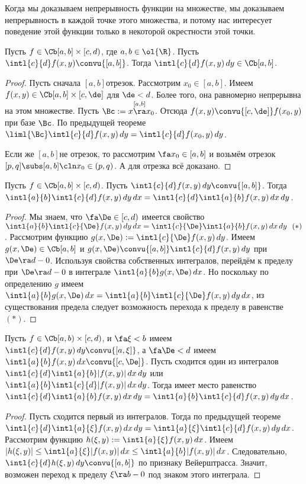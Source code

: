 \documentclass[a4paper]{article}
\newcommand{\intlab}{\intl{a}{b}}
\begin{document}
\begin{note}
Когда мы доказываем непрерывность функции на множестве, мы доказываем непрерывность в
каждой точке этого множества, и потому нас
интересует поведение этой функции только в некоторой окрестности этой точки.
\end{note}

\begin{imp}
Пусть $f \in\Cb[a,b]\times[c,d)$, где $a,b \in \ol{\R}$. Пусть $\intl{c}{d}f(x,y)\convu{[a,b]}$.
Тогда $\intl{c}{d}f(x,y)\,d y \in\Cb[a,b]$.
\end{imp}
\begin{proof}
Пусть сначала $[a,b]$\т отрезок. Рассмотрим $x_0 \in [a,b]$. Имеем
$f(x,y)\in\Cb[a,b]\times[c,\de]$ для $\de < d$. Более того, она равномерно непрерывна на этом
множестве. Пусть $\Bc := x \overset{[a,b]}{\ra} x_0$. Отсюда $f(x,y)\convu{[c,\de]}f(x_0,y)$ при
базе $\Bc$. По предыдущей теореме $\liml{\Bc}\intl{c}{d}f(x,y)\,d y=\intl{c}{d}f(x_0,y)\,d y$.

Если же $[a,b]$\т не отрезок, то рассмотрим $\fa x_0 \in [a,b]$ и возьмём отрезок
$[p,q] \subs [a,b]\cln x_0 \in (p,q)$. А для отрезка всё доказано.
\end{proof}

\begin{theorem}
Пусть $f\in\Cb[a,b]\times[c,d)$. Пусть $\intl{c}{d}f(x,y)\,d y\convu{[a,b]}$. Тогда $\intlab
\intl{c}{d}f(x,y)\,d y\,d x = \intl{c}{d}\intlab f(x,y)\,d x\,d y$.
\end{theorem}
\begin{proof}
Мы знаем, что $\fa \De \in [c,d)$ имеется свойство $\intlab \intl{c}{\De}f(x,y)\,d y\,d x =
\intl{c}{\De}\intlab f(x,y)\,d x\,d y~~(*)$. Рассмотрим функцию $g(x,\De) :=
\intl{c}{\De}f(x,y)\,d y$. Имеем $g(x,\De) \in\Cb[a,b]$ и
$g(x,\De)\convu{[a,b]}\intl{c}{d}f(x,y)\,d y$ при $\De \ra d-0$. Используя свойства собственных
интегралов, перейдём к пределу при $\De \ra d-0$ в интеграле $\intlab g(x,\De)\,d x$. Но поскольку
по определению $g$ имеем $\intlab g(x,\De)\,d x=\intlab \intl{c}{\De}f(x,y)\,d y\,d x$, из
существования предела следует возможность перехода к пределу в равенстве $(*)$.
\end{proof}

\begin{theorem}
Пусть $f\in\Cb[a,b)\times[c,d)$, и $\fa \xi < b$ имеем $\intl{c}{d}f(x,y)\,d y
\convu{[a,\xi]}$, а $\fa \De < d$ имеем $\intlab f(x,y)\,d x \convu{[c,\De]}$. Пусть сходится
один из интегралов $\intl{c}{d}\intlab |f(x,y)|\,d x\,d y$ или $\intlab \intl{c}{d}|f(x,y)|\,d
x\,d y$. Тогда имеет место равенство $\intl{c}{d}\intlab f(x,y)\,d x\,d y=\intlab \intl{c}{d}f(x,y)\,d y\,d x$.
\end{theorem}
\begin{proof}
Пусть сходится первый из интегралов. Тогда по предыдущей теореме
$\intl{c}{d}\intl{a}{\xi}f(x,y)\,d x\,d y=\intl{a}{\xi}\intl{c}{d}f(x,y)\,d y\,d x$. Рассмотрим
функцию $h(\xi,y) := \intl{a}{\xi}f(x,y)\,d x$. Имеем $|h(\xi,y)| \le \intl{a}{\xi}|f(x,y)|\,d x
\le \intlab |f(x,y)|\,d x$. Следовательно, $\intl{c}{d}h(\xi,y)\,d y \convu{[a,b]}$ по признаку
Вейерштрасса. Значит, возможен переход к пределу $\xi \ra b-0$ под знаком этого интеграла.
\end{proof}
\end{document}
